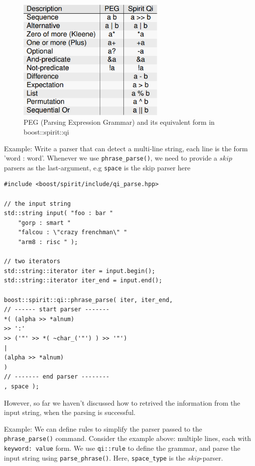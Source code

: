 \begin{figure}[hbt]
  \centerline{\includegraphics[height=6cm,
    angle=0]{./images/Boost_Spirit_operators.eps}}
  \caption{PEG (Parsing Expression Grammar) and its equivalent form in
  boost::spirit::qi}
  \label{fig:boost_spirit::qi_operators}
\end{figure}

Example: Write a parser that can detect a multi-line string, each line is the
form 'word : word'. Whenever we use \verb!phrase_parse()!, we need to provide a
$skip$ parsers as the last-argument, e.g \verb!space! is the skip parser here

\begin{verbatim}
#include <boost/spirit/include/qi_parse.hpp>

// the input string
std::string input( "foo : bar "
    "gorp : smart "
    "falcou : \"crazy frenchman\" "
    "arm8 : risc " );

// two iterators
std::string::iterator iter = input.begin();
std::string::iterator iter_end = input.end();

boost::spirit::qi::phrase_parse( iter, iter_end,
// ------ start parser -------
*( (alpha >> *alnum)
>> ':'
>> ('"' >> *( ~char_('"') ) >> '"')
|
(alpha >> *alnum)
)
// ------- end parser --------
, space );
\end{verbatim}

However, so far we haven't discussed how to retrived the information from the
input string, when the parsing is successful.


Example: We can define rules to simplify the parser passed to the
\verb!phrase_parse()! command. Consider the example above:
multiple lines, each with \verb!keyword: value! form. We use \verb!qi::rule! to
define the grammar, and parse the input string using \verb!parse_phrase()!.
Here, \verb!space_type! is the $skip$-parser.


